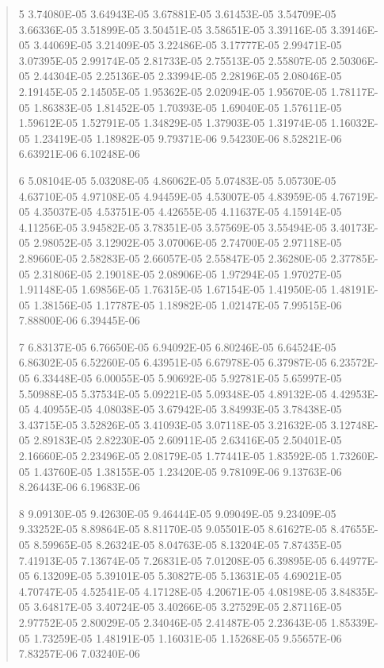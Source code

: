 \documentclass[letterpaper,10pt,english]{sphinxmanual}
\begin{document}
\begin{quote}
\begin{DUlineblock}{0em}
\begin{DUlineblock}{\DUlineblockindent}
\item[] 5   3.74080E-05  3.64943E-05  3.67881E-05  3.61453E-05  3.54709E-05  3.66336E-05  3.51899E-05  3.50451E-05  3.58651E-05  3.39116E-05  3.39146E-05  3.44069E-05  3.21409E-05  3.22486E-05  3.17777E-05  2.99471E-05  3.07395E-05  2.99174E-05  2.81733E-05  2.75513E-05  2.55807E-05  2.50306E-05  2.44304E-05  2.25136E-05  2.33994E-05  2.28196E-05  2.08046E-05  2.19145E-05  2.14505E-05  1.95362E-05  2.02094E-05  1.95670E-05  1.78117E-05  1.86383E-05  1.81452E-05  1.70393E-05  1.69040E-05  1.57611E-05  1.59612E-05  1.52791E-05  1.34829E-05  1.37903E-05  1.31974E-05  1.16032E-05  1.23419E-05  1.18982E-05  9.79371E-06  9.54230E-06  8.52821E-06  6.63921E-06  6.10248E-06
\item[] 6   5.08104E-05  5.03208E-05  4.86062E-05  5.07483E-05  5.05730E-05  4.63710E-05  4.97108E-05  4.94459E-05  4.53007E-05  4.83959E-05  4.76719E-05  4.35037E-05  4.53751E-05  4.42655E-05  4.11637E-05  4.15914E-05  4.11256E-05  3.94582E-05  3.78351E-05  3.57569E-05  3.55494E-05  3.40173E-05  2.98052E-05  3.12902E-05  3.07006E-05  2.74700E-05  2.97118E-05  2.89660E-05  2.58283E-05  2.66057E-05  2.55847E-05  2.36280E-05  2.37785E-05  2.31806E-05  2.19018E-05  2.08906E-05  1.97294E-05  1.97027E-05  1.91148E-05  1.69856E-05  1.76315E-05  1.67154E-05  1.41950E-05  1.48191E-05  1.38156E-05  1.17787E-05  1.18982E-05  1.02147E-05  7.99515E-06  7.88800E-06  6.39445E-06
\item[] 7   6.83137E-05  6.76650E-05  6.94092E-05  6.80246E-05  6.64524E-05  6.86302E-05  6.52260E-05  6.43951E-05  6.67978E-05  6.37987E-05  6.23572E-05  6.33448E-05  6.00055E-05  5.90692E-05  5.92781E-05  5.65997E-05  5.50988E-05  5.37534E-05  5.09221E-05  5.09348E-05  4.89132E-05  4.42953E-05  4.40955E-05  4.08038E-05  3.67942E-05  3.84993E-05  3.78438E-05  3.43715E-05  3.52826E-05  3.41093E-05  3.07118E-05  3.21632E-05  3.12748E-05  2.89183E-05  2.82230E-05  2.60911E-05  2.63416E-05  2.50401E-05  2.16660E-05  2.23496E-05  2.08179E-05  1.77441E-05  1.83592E-05  1.73260E-05  1.43760E-05  1.38155E-05  1.23420E-05  9.78109E-06  9.13763E-06  8.26443E-06  6.19683E-06
\item[] 8   9.09130E-05  9.42630E-05  9.46444E-05  9.09049E-05  9.23409E-05  9.33252E-05  8.89864E-05  8.81170E-05  9.05501E-05  8.61627E-05  8.47655E-05  8.59965E-05  8.26324E-05  8.04763E-05  8.13204E-05  7.87435E-05  7.41913E-05  7.13674E-05  7.26831E-05  7.01208E-05  6.39895E-05  6.44977E-05  6.13209E-05  5.39101E-05  5.30827E-05  5.13631E-05  4.69021E-05  4.70747E-05  4.52541E-05  4.17128E-05  4.20671E-05  4.08198E-05  3.84835E-05  3.64817E-05  3.40724E-05  3.40266E-05  3.27529E-05  2.87116E-05  2.97752E-05  2.80029E-05  2.34046E-05  2.41487E-05  2.23643E-05  1.85339E-05  1.73259E-05  1.48191E-05  1.16031E-05  1.15268E-05  9.55657E-06  7.83257E-06  7.03240E-06

\end{DUlineblock}
\end{DUlineblock}
\end{quote}
\end{document}
